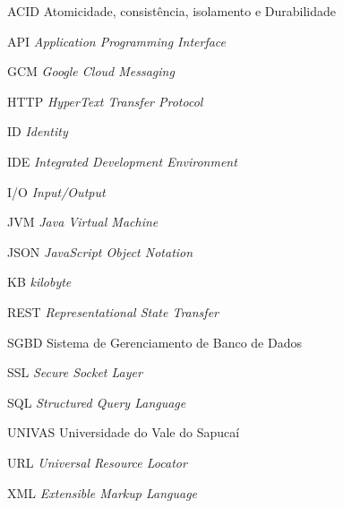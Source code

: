 
\begin{SingleSpace}

	\begin{siglas}
		
		\item[ACID] Atomicidade, consistência, isolamento e Durabilidade
		
		\item[API] \textit{Application Programming Interface}
		
		\item[GCM] \textit{Google Cloud Messaging}

		\item[HTTP] \textit{HyperText Transfer Protocol}

		\item[ID] \textit{Identity}
		
		\item[IDE] \textit{Integrated Development Environment}
		
		\item[I/O] \textit{Input/Output}
		
		\item[JVM] \textit{Java Virtual Machine} 
		
		\item[JSON] \textit{JavaScript Object Notation}

		\item[KB]	\textit{kilobyte}
		
		\item[REST] \textit{Representational State Transfer}
		
		\item[SGBD] Sistema de Gerenciamento de Banco de Dados
				
		\item[SSL] \textit{Secure Socket Layer}
		
		\item[SQL] \textit{Structured Query Language}
		
		\item[UNIVAS] Universidade do Vale do Sapucaí
				
		\item[URL] \textit{Universal Resource Locator}
		
		\item[XML] \textit{Extensible Markup Language}
	
	\end{siglas}

\end{SingleSpace}
